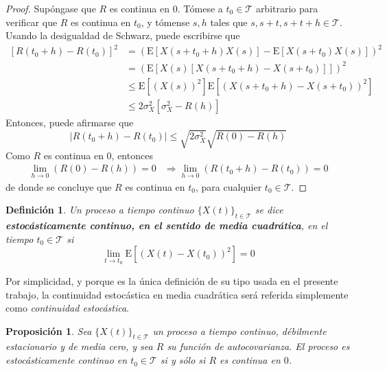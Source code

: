\documentclass[12pt,letterpaper]{book}
\newtheorem{definicion}{Definición}[chapter]
\newtheorem{proposicion}[teorema]{Proposición}
\newcommand{\E}[1]{\mathrm{E}\left[ #1 \right]}
\newcommand{\abso}[1]{\left| #1 \right|}
\newcommand{\xt}{$\{X(t)\}_{t\in \mathcal{T}}$ }
\begin{document}
\begin{proof}
Supóngase que $R$ es continua en 0. Tómese a $t_0 \in \mathcal{T}$ arbitrario para verificar que $R$ es continua en $t_0$, y tómense $s,h$ tales que $s,s+t,s+t+h \in\mathcal{T}$. Usando la desigualdad de Schwarz, puede escribirse que
\begin{align*}
\left[ R(t_0+h) -R(t_0) \right]^{2} 
&= \left( \E{X(s+t_0+h)X(s)} - \E{X(s+t_0)X(s)} \right)^{2}  \\
&= \left( \E{X(s)\left[ X(s+t_0+h) - X(s+t_0) \right]} \right)^{2} \\
&\leq \E{\left( X(s) \right)^{2}} \E{\left( X(s+t_0+h) - X(s+t_0) \right)^{2}} \\
&\leq 2 \sigma_X^{2} \left[ \sigma_X^{2} - R(h) \right]
\end{align*}
Entonces, puede afirmarse que
\begin{equation*}
\abso{R(t_0+h) -R(t_0)} \leq \sqrt{2 \sigma_X^{2}} \sqrt{R(0) - R(h)}
\end{equation*}
Como $R$ es continua en 0, entonces 
\begin{align*}
\lim_{h\rightarrow 0} (R(0)-R(h)) = 0 &\Rightarrow \lim_{h\rightarrow 0} (R(t_0+h)-R(t_0)) = 0
\end{align*}
de donde se concluye que $R$ es continua en $t_0$, para cualquier $t_0\in \mathcal{T}$.
\end{proof}    

\begin{definicion}%
Un proceso a tiempo continuo \xt se dice \textbf{estocásticamente continuo, en el sentido de media cuadrática}, en el tiempo $t_0\in \mathcal{T}$ si
\begin{equation*}
\lim_{t \rightarrow t_0} \E{\left( X(t) - X(t_0) \right)^{2}} = 0
\end{equation*}
\label{cont_est}
\end{definicion}

Por simplicidad, y porque es la única definición de su tipo usada en el presente trabajo, la continuidad estocástica en media cuadrática será referida simplemente como \textit{continuidad estocástica}.

\begin{proposicion}
Sea \xt un proceso a tiempo continuo, débilmente estacionario y de media cero, y sea $R$ su función de autocovarianza. El proceso es estocásticamente continuo en $t_0\in \mathcal{T}$ si y sólo si $R$ es continua en $0$.
\label{lazy:aaa}
\end{proposicion}
\end{document}
